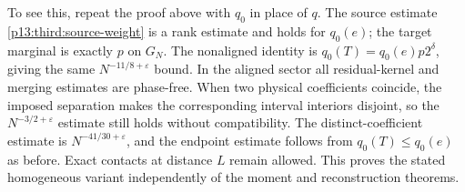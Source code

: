To see this, repeat the proof above with $q_0$ in place of $q$.
The source estimate \eqref{p13:third:source-weight} is a rank estimate
and holds for $q_0(e)$; the target marginal is exactly $p$ on $G_N$.
The nonaligned identity is
$q_0(T)=q_0(e)p2^\delta$, giving the same $N^{-11/8+\varepsilon}$ bound.
In the aligned sector all residual-kernel and merging estimates are
phase-free. When two physical coefficients coincide, the imposed
separation makes the corresponding interval interiors disjoint, so
the $N^{-3/2+\varepsilon}$ estimate still holds without compatibility.
The distinct-coefficient estimate is $N^{-41/30+\varepsilon}$, and the
endpoint estimate follows from $q_0(T)\le q_0(e)$ as before.
Exact contacts at distance $L$ remain allowed. This proves the stated
homogeneous variant independently of the moment and reconstruction theorems.
